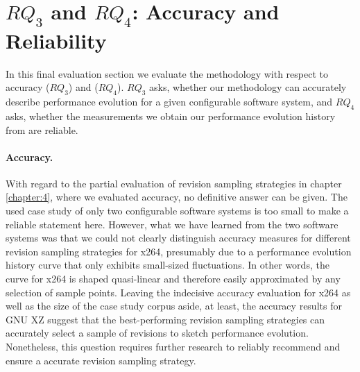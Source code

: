 \section{$RQ_3$ and $RQ_4$: Accuracy and Reliability}
\label{sec:reliability} In this final evaluation section we evaluate the
methodology with respect to accuracy ($RQ_3$) and ($RQ_4$). $RQ_3$ asks, whether
our methodology can accurately describe performance evolution for a given
configurable software system, and $RQ_4$ asks, whether the measurements we
obtain our performance evolution history from are reliable.

\paragraph{Accuracy.} With regard to the partial
evaluation of revision sampling strategies in chapter\,\ref{chapter:4}, where we
evaluated accuracy, no definitive answer can be given.
The used case study of only two configurable software systems is too small to make a reliable statement
here. However, what we have learned from the two software systems was that we
could not clearly distinguish accuracy measures for different revision sampling
strategies for x264, presumably due to a performance evolution history curve
that only exhibits small-sized fluctuations. In other words, the curve for x264
is shaped quasi-linear and therefore easily approximated by any selection of
sample points. Leaving the indecisive accuracy evaluation for x264 as well as
the size of the case study corpus aside, at least, the accuracy results for GNU
XZ suggest that the best-performing revision sampling strategies can accurately
select a sample of revisions to sketch performance evolution. Nonetheless, this
question requires further research to reliably recommend and ensure a accurate
revision sampling strategy.

